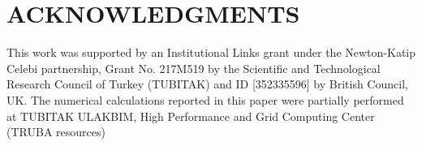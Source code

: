 \documentclass[runningheads]{llncs}
\begin{document}
\begin{comment}

\clearpage\mbox{}Page \thepage\ of the manuscript.
\clearpage\mbox{}Page \thepage\ of the manuscript.

This is the last page of the manuscript.
\par\vfill\par
Now we have reached the maximum size of the ECCV 2020 submission (excluding references).
References should start immediately after the main text, but can continue on p.15 if needed.
\end{comment}

\section*{ACKNOWLEDGMENTS}
This work was supported by an Institutional Links grant under the Newton-Katip Celebi partnership, Grant No. 217M519 by the Scientific and Technological Research Council of Turkey (TUBITAK) and ID [352335596] by British Council, UK. The numerical calculations reported in this paper were partially performed at TUBITAK ULAKBIM, High Performance and Grid Computing Center (TRUBA resources)

\clearpage


\end{document}
